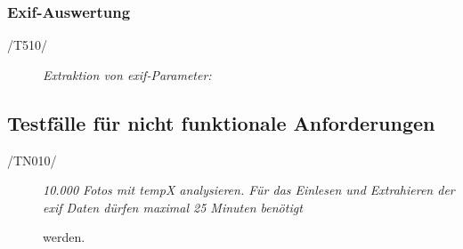 	\subsubsection{Exif-Auswertung}
	
		\begin{description}

			\item[/T510/] \textit{Extraktion von \gls{exif}-Parameter:}\par 

		\end{description}
		
\subsection{Testfälle für nicht funktionale Anforderungen}
	
	\begin{description}
		
			\item[/TN010/]\textit{10.000 Fotos mit \gls{tempX} analysieren. Für das Einlesen und Extrahieren der \gls{exif} Daten dürfen maximal 25 Minuten benötigt}\par werden.
	
	\end{description}